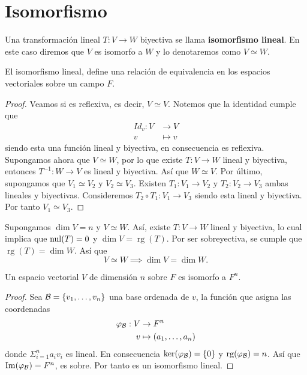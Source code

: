 \documentclass[12pt,a4paper]{book}
\DeclareMathOperator{\rg}{rg}
\newcommand{\llaves}[1]{\{#1\}}
\begin{document}
    \section{Isomorfismo}

    \begin{definicion}
        Una transformación lineal $T:V \to W$ biyectiva se llama \textbf{isomorfismo lineal}. En este caso diremos que $V$ es isomorfo a
        $W$ y lo denotaremos como $V \simeq W$.
    \end{definicion}

    \begin{proposicion}
        El isomorfismo lineal, define una relación de equivalencia en los espacios vectoriales sobre un campo $F$.
    \end{proposicion}

    \begin{proof}
        Veamos si es reflexiva, es decir, $V \simeq V$. Notemos que la identidad cumple que
        \begin{align*}
            Id_v: V & \to V\\
            v & \mapsto v
        \end{align*}
        siendo esta una función lineal y biyectiva, en consecuencia es reflexiva.
        Supongamos ahora que $V \simeq W$, por lo que existe $T: V \to W$ lineal y biyectiva, entonces $T^{-1}: W \to V$ es lineal y biyectiva. Así que $W \simeq V$.
        Por último, supongamos que $V_1 \simeq V_2$ y $V_2 \simeq V_3$. Existen $T_1:V_1 \to V_2$ y $T_2: V_2 \to V_3$ ambas lineales y biyectivas. Consideremos $T_2 \circ T_1: V_1 \to V_3$ siendo esta lineal y biyectiva. Por tanto $V_1 \simeq V_3$.
    \end{proof}

    Supongamos $\dim V = n$ y $V \simeq W$. Así, existe $T: V \to W$ lineal y biyectiva, lo cual implica que $\operatorname{nul}(T) = 0$ y $\dim V = \rg (T)$. Por ser sobreyectiva, se cumple que $\rg (T) = \dim W$. Así que
    \begin{equation*}
        V \simeq W \implies \dim V = \dim W.
    \end{equation*}

    \begin{teorema}
        Un espacio vectorial $V$ de dimensión $n$ sobre $F$ es isomorfo a $F^n$.
    \end{teorema}

    \begin{proof}
        Sea $\BB = \llaves{v_1, \dots , v_n}$ una base ordenada de $v$, la función que asigna las coordenadas 
        \begin{align*}
            \varphi_{\mathcal{B}}: V & \to F^n\\
            v & \mapsto (a_1, \dots, a_n)
        \end{align*}
        donde $\Sigma_{i = 1}^n a_iv_i$ es lineal. En consecuencia $\ker (\varphi_\BB) = \llaves{0}$ y $\rg (\varphi_\BB) = n$. Así que $\Im (\varphi_{\mathcal{B}}) = F^n$, es sobre. Por tanto es un isomorfismo lineal.
    \end{proof}
\end{document}

